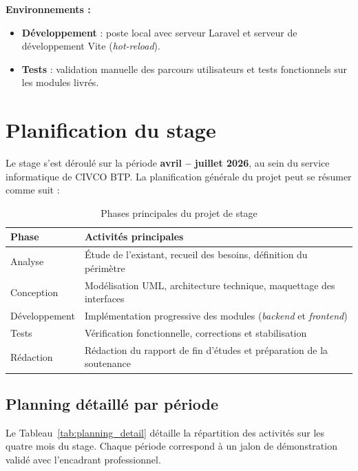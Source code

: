 \textbf{Environnements :}
\begin{itemize}
  \item \textbf{Développement} : poste local avec serveur Laravel et serveur de
  développement Vite (\textit{hot-reload}).
  \item \textbf{Tests} : validation manuelle des parcours utilisateurs et tests
  fonctionnels sur les modules livrés.
\end{itemize}

\section{Planification du stage}

Le stage s'est déroulé sur la période \textbf{avril -- juillet 2026}, au sein du service
informatique de CIVCO BTP. La planification générale du projet peut se résumer comme suit :

\begin{table}[H]
\centering
\caption{Phases principales du projet de stage}
\label{tab:planification}
\begin{tabularx}{\textwidth}{|l|X|}
\hline
\textbf{Phase} & \textbf{Activités principales} \\
\hline
Analyse & Étude de l'existant, recueil des besoins, définition du périmètre \\
\hline
Conception & Modélisation UML, architecture technique, maquettage des interfaces \\
\hline
Développement & Implémentation progressive des modules (\textit{backend} et \textit{frontend}) \\
\hline
Tests & Vérification fonctionnelle, corrections et stabilisation \\
\hline
Rédaction & Rédaction du rapport de fin d'études et préparation de la soutenance \\
\hline
\end{tabularx}
\end{table}

\subsection{Planning détaillé par période}

Le Tableau~\ref{tab:planning_detail} détaille la répartition des activités sur
les quatre mois du stage. Chaque période correspond à un jalon de démonstration
validé avec l'encadrant professionnel.


